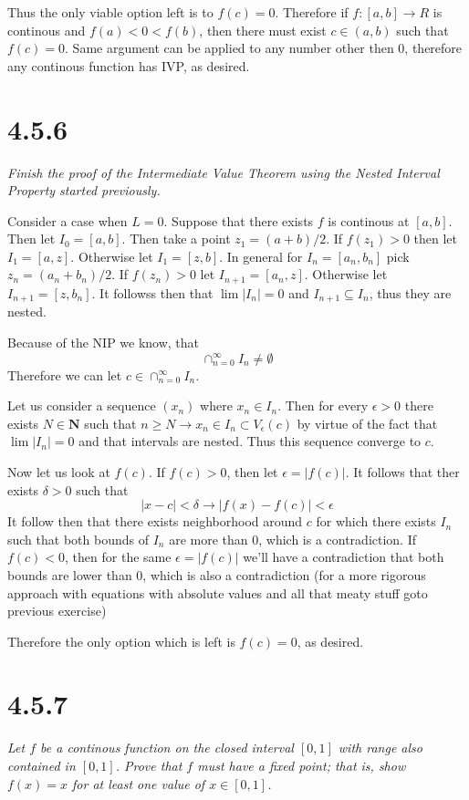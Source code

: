 \documentclass[11pt,oneside,titlepage]{book}
\begin{document}
Thus the only viable option left is to $f(c) = 0$. Therefore if
$f: [a, b] \to R$ is continous and $f(a) < 0 < f(b)$, then there
must exist $c \in (a, b)$ such that $f(c) = 0$. Same argument can be
applied to any number other then $0$, therefore any continous
function has IVP, as desired.


\section*{4.5.6}
\textit{Finish the proof of the Intermediate Value Theorem using the Nested Interval Property started previously.}

Consider a case when $L = 0$. 
Suppose that there exists $f$ is continous at $[a, b]$. Then let
$I_0 = [a, b]$. Then take a point $z_1 = (a + b)/2$. If $f(z_1) > 0$ then
let $I_1 = [a, z]$. Otherwise let $I_1 = [z, b]$. In general for
$I_n = [a_n, b_n]$ pick $z_n = (a_n + b_n) / 2$. If $f(z_n) > 0$
let $I_{n + 1} = [a_n, z]$. Otherwise let $I_{n + 1} = [z, b_n]$.
It followss then that $\lim |I_n| = 0$ and $I_{n + 1} \subseteq I_n$, thus
they are nested.

Because of the NIP we know, that
$$\cap_{n = 0}^{\infty} I_n \neq \emptyset$$
Therefore we can let $c \in \cap_{n = 0}^{\infty} I_n$.

Let us consider a sequence $(x_n)$ where $x_n \in I_n$. Then
for every $\epsilon > 0$ there exists $N \in \textbf{N}$  such that
$n \geq N \to
x_n \in I_n \subset V_\epsilon(c)$ by virtue of the fact that
$\lim|I_n| = 0$ and that intervals are nested. Thus this sequence converge to $c$.

Now let us look at $f(c)$. If $f(c) > 0$, then let $\epsilon = |f(c)|$.
It follows that ther exists $\delta> 0$ such that
$$|x - c| < \delta \to |f(x) - f(c)| < \epsilon$$
It follow then that there exists neighborhood around $c$ for which
there exists $I_n$ such that both bounds of $I_n$ are more than $0$, which
is a contradiction.
If $f(c) < 0$, then for the same $\epsilon = |f(c)|$ we'll have a contradiction
that both bounds are lower than $0$, which is also a contradiction (for a more
rigorous approach with equations with absolute values and all that
meaty stuff goto previous exercise)

Therefore the only option which is left is $f(c) = 0$, as desired. 

\section*{4.5.7}
\textit{Let $f$ be a continous function on the closed interval $[0, 1]$ with
  range also contained in $[0, 1]$. Prove that $f$ must have a fixed point;
  that is, show $f(x) = x$ for at least one value of $x \in [0, 1]$.}
\end{document}
